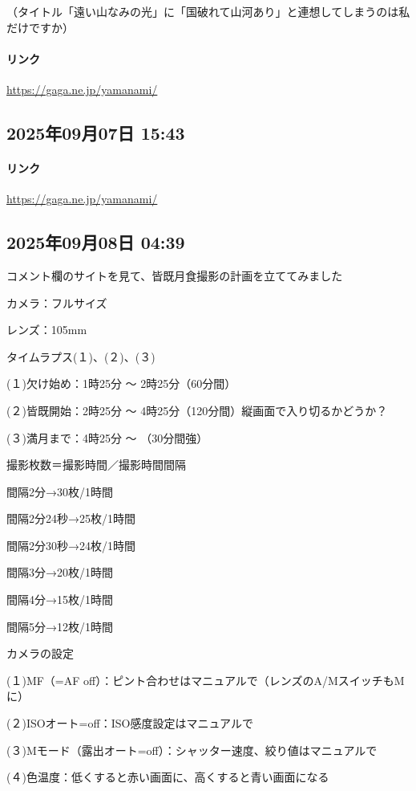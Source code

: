 （タイトル「遠い山なみの光」に「国破れて山河あり」と連想してしまうのは私だけですか）

\paragraph{リンク}
\url{https://gaga.ne.jp/yamanami/}

\subsection*{2025年09月07日 15:43}

\paragraph{リンク}
\url{https://gaga.ne.jp/yamanami/}

\subsection*{2025年09月08日 04:39}

コメント欄のサイトを見て、皆既月食撮影の計画を立ててみました

カメラ：フルサイズ

レンズ：105mm

タイムラプス(１)、(２)、(３)

(１)欠け始め：1時25分 〜 2時25分（60分間）

(２)皆既開始：2時25分 〜 4時25分（120分間）縦画面で入り切るかどうか？

(３)満月まで：4時25分 〜 （30分間強）

撮影枚数＝撮影時間／撮影時間間隔

間隔2分→30枚/1時間

間隔2分24秒→25枚/1時間

間隔2分30秒→24枚/1時間

間隔3分→20枚/1時間

間隔4分→15枚/1時間

間隔5分→12枚/1時間

カメラの設定

(１)MF（=AF off）：ピント合わせはマニュアルで（レンズのA/MスイッチもMに）

(２)ISOオート=off：ISO感度設定はマニュアルで

(３)Mモード（露出オート=off）：シャッター速度、絞り値はマニュアルで

(４)色温度：低くすると赤い画面に、高くすると青い画面になる

